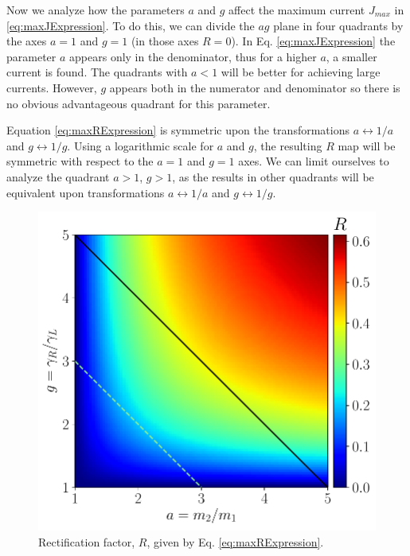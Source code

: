 %
Now we analyze how the parameters $a$ and $g$ affect the maximum current $J_{max}$ in \eqref{eq:maxJExpression}. To do this, we can divide the $ag$ plane in four quadrants by the axes $a = 1$ and $g = 1$ (in those axes $R = 0$). In Eq. \eqref{eq:maxJExpression} the parameter $a$ appears only in the denominator, thus for a higher $a$, a smaller current is found. The quadrants with $a < 1$ will be better for achieving large currents. However, $g$ appears both in the numerator and denominator so there is no obvious advantageous quadrant for this parameter.

Equation \eqref{eq:maxRExpression} is symmetric upon the transformations $a \leftrightarrow 1/a$ and $g \leftrightarrow 1/g$. Using a logarithmic scale for $a$ and $g$, the resulting $R$ map will be symmetric with respect to the $a=1$ and $g=1$ axes. We can limit ourselves to analyze the quadrant $a > 1$, $g > 1$, as the results in other quadrants will be equivalent upon transformations $a \leftrightarrow 1/a$ and $g \leftrightarrow 1/g$.


\begin{figure}
  \centering
  \includegraphics[width=\linewidth]{Figures/Rade.pdf}
  \caption{Rectification factor, $R$, given by Eq. \eqref{eq:maxRExpression}.}
  \label{fig:R_g_a_plane}
\end{figure}

